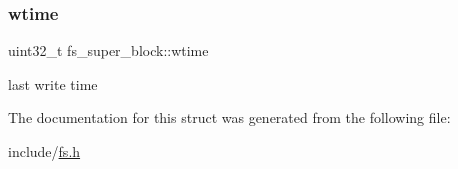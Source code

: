 \subsubsection{\texorpdfstring{wtime}{wtime}}
{\footnotesize\ttfamily uint32\+\_\+t fs\+\_\+super\+\_\+block\+::wtime}

last write time 

The documentation for this struct was generated from the following file\+:\begin{DoxyCompactItemize}
\item 
include/\mbox{\hyperlink{fs_8h}{fs.\+h}}\end{DoxyCompactItemize}
